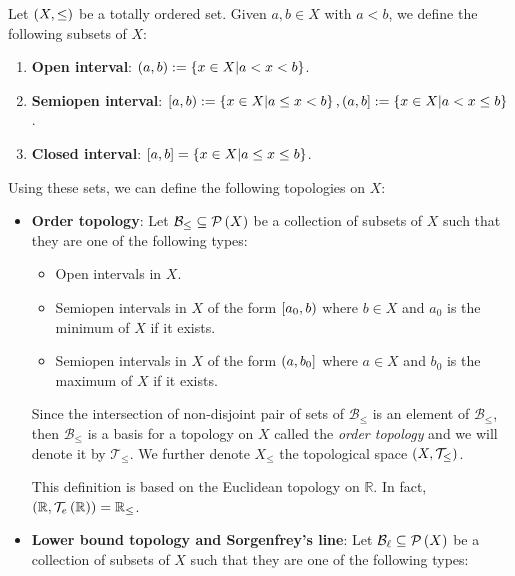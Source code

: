 \begin{example}
  Let $\left(X,\leq\right)$ be a totally ordered set. Given $a,b\in X$ with $a<b$, we define the following subsets of $X$:

  \begin{enumerate}
    \item \textbf{Open interval}: $\left(a,b\right):=\left\{x\in X\middle|a<x<b\right\}$.
    \item \textbf{Semiopen interval}: $\left[a,b\right):=\left\{x\in X\middle|a\leq x<b\right\}, \left(a,b\right]:=\left\{x\in X\middle|a<x\leq b\right\}$.
    \item \textbf{Closed interval}: $\left[a,b\right]=\left\{x\in X\middle|a\leq x\leq b\right\}$.
  \end{enumerate}

  Using these sets, we can define the following topologies on $X$:

  \begin{itemize}
      \item \textbf{Order topology}: Let $\mathcal{B}_{\leq}\subseteq\mathcal{P}\left(X\right)$ be a collection of subsets of $X$ such that they are one of the following types:

      \begin{itemize}
        \item[(i)] Open intervals in $X$.
        \item[(ii)] Semiopen intervals in $X$ of the form $\left[a_0,b\right)$ where $b\in X$ and $a_0$ is the minimum of $X$ if it exists.
        \item[(iii)] Semiopen intervals in $X$ of the form $\left(a,b_0\right]$ where $a\in X$ and $b_0$ is the maximum of $X$ if it exists.
      \end{itemize}

      Since the intersection of non-disjoint pair of sets of $\mathcal{B}_{\leq}$ is an element of $\mathcal{B}_{\leq}$, then $\mathcal{B}_{\leq}$ is a basis for a topology on $X$ called the \emph{order topology} and we will denote it by $\mathcal{T}_{\leq}$. We further denote $X_{\leq}$ the topological space $\left(X,\mathcal{T}_{\leq}\right)$.

      This definition is based on the Euclidean topology on $\mathbb{R}$. In fact, $\left(\mathbb{R},\mathcal{T}_e\left(\mathbb{R}\right)\right)=\mathbb{R}_{\leq}$.

      \item \textbf{Lower bound topology and Sorgenfrey's line}: Let $\mathcal{B}_{\ell}\subseteq\mathcal{P}\left(X\right)$ be a collection of subsets of $X$ such that they are one of the following types:


\end{itemize}
\end{example}
